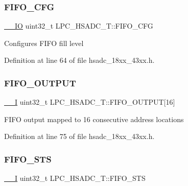 \subsubsection{\texorpdfstring{F\+I\+F\+O\+\_\+\+C\+FG}{FIFO\_CFG}}
{\footnotesize\ttfamily \hyperlink{core__sc300_8h_aec43007d9998a0a0e01faede4133d6be}{\+\_\+\+\_\+\+IO} uint32\+\_\+t L\+P\+C\+\_\+\+H\+S\+A\+D\+C\+\_\+\+T\+::\+F\+I\+F\+O\+\_\+\+C\+FG}

Configures F\+I\+FO fill level 

Definition at line 64 of file hsadc\+\_\+18xx\+\_\+43xx.\+h.

\mbox{\label{struct_l_p_c___h_s_a_d_c___t_ab199798a386b81cfb9293e32378cdea4}} 
\subsubsection{\texorpdfstring{F\+I\+F\+O\+\_\+\+O\+U\+T\+P\+UT}{FIFO\_OUTPUT}}
{\footnotesize\ttfamily \hyperlink{core__sc300_8h_af63697ed9952cc71e1225efe205f6cd3}{\+\_\+\+\_\+I} uint32\+\_\+t L\+P\+C\+\_\+\+H\+S\+A\+D\+C\+\_\+\+T\+::\+F\+I\+F\+O\+\_\+\+O\+U\+T\+P\+UT\mbox{[}16\mbox{]}}

F\+I\+FO output mapped to 16 consecutive address locations 

Definition at line 75 of file hsadc\+\_\+18xx\+\_\+43xx.\+h.

\mbox{\label{struct_l_p_c___h_s_a_d_c___t_aac288ec3ba0d783f205157b0d659a2b9}} 
\subsubsection{\texorpdfstring{F\+I\+F\+O\+\_\+\+S\+TS}{FIFO\_STS}}
{\footnotesize\ttfamily \hyperlink{core__sc300_8h_af63697ed9952cc71e1225efe205f6cd3}{\+\_\+\+\_\+I} uint32\+\_\+t L\+P\+C\+\_\+\+H\+S\+A\+D\+C\+\_\+\+T\+::\+F\+I\+F\+O\+\_\+\+S\+TS}

